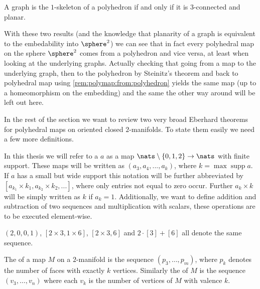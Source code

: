 \begin{theorem} A graph is the $1$-skeleton of a polyhedron if and only if it is $3$-connected and planar.
\end{theorem}

With these two results (and the knowledge that planarity of a graph is equivalent to the embedability into $\sphere^2$) we can see that in fact every polyhedral map on the sphere $\sphere^2$ comes from a polyhedron and vice versa, at least when looking at the underlying graphs. Actually checking that going from a map to the underlying graph, then to the polyhedron by {\sc Steinitz}'s theorem and back to polyhedral map using \autoref{rem:polymap:from:polyhedron} yields the same map (up to a homeomorphism on the embedding) and the same the other way around will be left out here.

In the rest of the section we want to review two very broad {\sc Eberhard} theorems for polyhedral maps on oriented closed $2$-manifolds. To state them easily we need a few more definitions.

\begin{definition}[Sequence]
  In this thesis we will refer to a  $a$ as a map $\nats \setminus \{0, 1, 2\} \rightarrow \nats$ with finite support. These maps will be written as $(a_3, a_4, ..., a_k)$, where $k = \operatorname{max} \operatorname{supp} a$. If $a$ has a small but wide support this notation will be further abbreviated by $[a_{k_1} \times k_1, a_{k_2} \times k_2, ...]$, where only entries not equal to zero occur. Further $a_k \times k$ will be simply written as $k$ if $a_k = 1$. Additionally, we want to define addition and subtraction of two sequences and multiplication with scalars, these operations are to be executed element-wise.
\end{definition}
\begin{example}
  $(2, 0, 0, 1)$, $[2 \times 3, 1 \times 6]$, $[2 \times 3, 6]$ and $2 \cdot [3] + [6]$ all denote the same sequence.
\end{example}
\begin{definition}\label{def:relizable}
  The  of a map $M$ on a $2$-manifold is the sequence $(p_3, \dots, p_m)$, where $p_k$ denotes the number of faces with exactly $k$ vertices. Similarly the  of $M$ is the sequence $(v_3, \dots, v_n)$ where each $v_k$ is the number of vertices of $M$ with valence $k$.
\end{definition}

